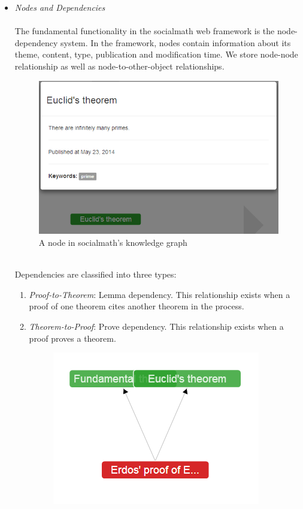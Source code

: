 \documentclass{acm_proc_article-sp}
\begin{document}
\begin{itemize}

\item \emph{Nodes and Dependencies} \\\\
The fundamental functionality in the socialmath web framework is the node-dependency system. In the framework, nodes contain information about its theme, content, type, publication and modification time. We store node-node relationship as well as node-to-other-object relationships. 
\begin{figure}[h!]
\centering
\includegraphics[scale=0.37]{oneNode.png}
\caption{A node in socialmath's knowledge graph}
\end{figure}\\
Dependencies are classified into three types:
\begin{enumerate}
\item \emph{Proof-to-Theorem}: Lemma dependency. This relationship exists when a proof of one theorem cites another theorem in the process. 
\item \emph{Theorem-to-Proof}: Prove dependency. This relationship exists when a proof proves a theorem. 
\begin{figure}[h!]
\centering
\includegraphics[scale=0.3]{prove_lemma_relationship.png}

\end{figure}
\end{enumerate}
\end{itemize}
\end{document}
